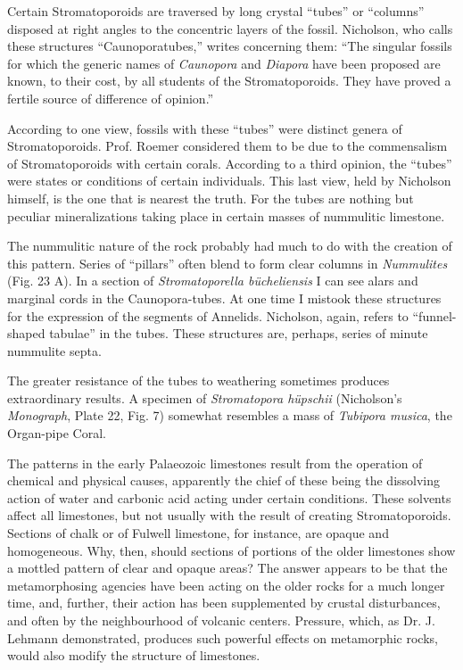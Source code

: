 \documentclass[a4paper, 12pt, oneside]{article}
\begin{document}
Certain Stromatoporoids are traversed by long crystal ``tubes'' or ``columns'' disposed at right angles to the concentric layers of the fossil. Nicholson, who calls these structures ``Caunoporatubes,'' writes concerning them: ``The singular fossils for which the generic names of \emph{Caunopora} and \emph{Diapora} have been proposed are known, to their cost, by all students of the Stromatoporoids. They have proved a fertile source of difference of opinion.''

According to one view, fossils with these ``tubes'' were distinct genera of Stromatoporoids. Prof. Roemer considered them to be due to the commensalism of Stromatoporoids with certain corals. According to a third opinion, the ``tubes'' were states or conditions of certain individuals. This last view, held by Nicholson himself, is the one that is nearest the truth. For the tubes are nothing but peculiar mineralizations taking place in certain masses of nummulitic limestone.

The nummulitic nature of the rock probably had much to do with the creation of this pattern. Series of ``pillars'' often blend to form clear columns in \emph{Nummulites} (Fig. 23 A). In a section of \emph{Stromatoporella bücheliensis} I can see alars and marginal cords in the Caunopora-tubes. At one time I mistook these structures for the expression of the segments of Annelids. Nicholson, again, refers to ``funnel-shaped tabulae'' in the tubes. These structures are, perhaps, series of minute nummulite septa.

The greater resistance of the tubes to weathering sometimes produces extraordinary results. A specimen of \emph{Stromatopora hüpschii} (Nicholson's \emph{Monograph}, Plate 22, Fig. 7) somewhat resembles a mass of \emph{Tubipora musica}, the Organ-pipe Coral.

The patterns in the early Palaeozoic limestones result from the operation of chemical and physical causes, apparently the chief of these being the dissolving action of water and carbonic acid acting under certain conditions. These solvents affect all limestones, but not usually with the result of creating Stromatoporoids. Sections of chalk or of Fulwell limestone, for instance, are opaque and homogeneous. Why, then, should sections of portions of the older limestones show a mottled pattern of clear and opaque areas? The answer appears to be that the metamorphosing agencies have been acting on the older rocks for a much longer time, and, further, their action has been supplemented by crustal disturbances, and often by the neighbourhood of volcanic centers. Pressure, which, as Dr. J. Lehmann demonstrated, produces such powerful effects on metamorphic rocks, would also modify the structure of limestones.
\end{document}
